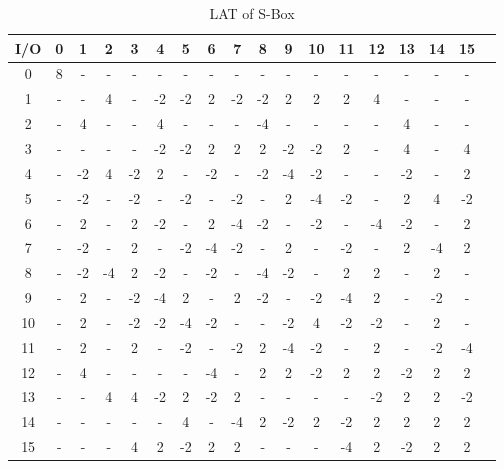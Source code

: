 \documentclass[preprint]{transcrypto}
\begin{document}
\begin{table}[H]
	\begin{center}
	\begin{tabular}{||c||c|c|c|c|c|c|c|c|c|c|c|c|c|c|c|c|c|}
	    \hline
	    I/O & 0 & 1 & 2 & 3 & 4 & 5 & 6 & 7 & 8 & 9 & 10 & 11 & 12 & 13 & 14 & 15\\
		\hline
		\hline
        0 & 8 & - & - & - & - & - & - & - & - & - & - & - & - & - & - & - \\
        \hline
        1 & - & - & 4 & - & -2 & -2 & 2 & -2 & -2 & 2 & 2 & 2 & 4 & - & - & - \\
        \hline
        2 & - & 4 & - & - & 4 & - & - & - & -4 & - & - & - & - & 4 & - & - \\
        \hline
        3 & - & - & - & - & -2 & -2 & 2 & 2 & 2 & -2 & -2 & 2 & - & 4 & - & 4 \\
        \hline
        4 & - & -2 & 4 & -2 & 2 & - & -2 & - & -2 & -4 & -2 & - & - & -2 & - & 2 \\
        \hline
        5 & - & -2 & - & -2 & - & -2 & - & -2 & - & 2 & -4 & -2 & - & 2 & 4 & -2 \\
        \hline
        6 & - & 2 & - & 2 & -2 & - & 2 & -4 & -2 & - & -2 & - & -4 & -2 & - & 2 \\
        \hline
        7 & - & -2 & - & 2 & - & -2 & -4 & -2 & - & 2 & - & -2 & - & 2 & -4 & 2 \\
        \hline
        8 & - & -2 & -4 & 2 & -2 & - & -2 & - & -4 & -2 & - & 2 & 2 & - & 2 & - \\
        \hline
        9 & - & 2 & - & -2 & -4 & 2 & - & 2 & -2 & - & -2 & -4 & 2 & - & -2 & - \\
        \hline
        10 & - & 2 & - & -2 & -2 & -4 & -2 & - & - & -2 & 4 & -2 & -2 & - & 2 & - \\
        \hline
        11 & - & 2 & - & 2 & - & -2 & - & -2 & 2 & -4 & -2 & - & 2 & - & -2 & -4 \\
        \hline
        12 & - & 4 & - & - & - & - & -4 & - & 2 & 2 & -2 & 2 & 2 & -2 & 2 & 2 \\
        \hline
        13 & - & - & 4 & 4 & -2 & 2 & -2 & 2 & - & - & - & - & -2 & 2 & 2 & -2 \\
        \hline
        14 & - & - & - & - & - & 4 & - & -4 & 2 & -2 & 2 & -2 & 2 & 2 & 2 & 2 \\
        \hline
        15 & - & - & - & 4 & 2 & -2 & 2 & 2 & - & - & - & -4 & 2 & -2 & 2 & 2 \\
        \hline
	\end{tabular}
	\end{center}
	\caption{LAT of S-Box}
	\label{table:lat}
\end{table}
\end{document}
